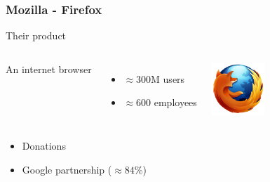 \documentclass{beamer}
\begin{document}
\begin{frame}

  \frametitle{Mozilla - Firefox}

  \begin{block}{Their product}
    \begin{columns}[c]

      An internet browser
      \begin{itemize}
        \item{$\approx 300$M users}
        \item{$\approx 600$ employees}
      \end{itemize}

      \includegraphics[width=2cm]{logo_firefox.png}

    \end{columns}
  \end{block}

  \vfill

  \begin{itemize}
    \item<2->{Donations}
    \item<3>{Google partnership ($\approx 84\%$)}
  \end{itemize}

\end{frame}
\end{document}
